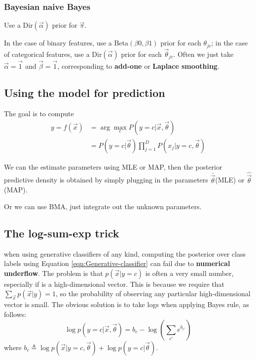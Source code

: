 {\subsubsection{Bayesian naive Bayes}
\label{sec:Bayesian-naive-Bayes}
Use a Dir$(\vec{\alpha})$ prior for $\vec{\pi}$.

In the case of binary features, use a Beta$(\beta0,\beta1)$ prior for each $\theta_{jc}$; in the case of categorical features, use a Dir$(\vec{\alpha})$ prior for each  $\vec{\theta}_{jc}$. Often we just take $\vec{\alpha}=\vec{1}$ and $\vec{\beta}=\vec{1}$, corresponding to \textbf{add-one} or \textbf{Laplace smoothing}.


\subsection{Using the model for prediction}
The goal is to compute
\begin{equation}\begin{split}
y=f(\vec{x}) & =\arg\max\limits_{c}{P(y=c|\vec{x},\vec{\theta})} \\
   & =P(y=c|\vec{\theta})\prod_{j=1}^D P(x_j|y=c,\vec{\theta})
\end{split}\end{equation}

We can the estimate parameters using MLE or MAP, then the posterior predictive density is obtained by simply plugging in the parameters $\bar{\vec{\theta}}$(MLE) or $\hat{\vec{\theta}}$(MAP). 

Or we can use BMA, just integrate out the unknown parameters.


\subsection{The log-sum-exp trick}
when using generative classifiers of any kind, computing the posterior over class labels using Equation \ref{eqn:Generative-classifier} can fail due to \textbf{numerical underflow}. The problem is that $p(\vec{x}|y=c)$ is often a very small number, especially if  is a high-dimensional vector. This is because we require that $\sum_{\vec{x}}p(\vec{x}|y)=1$, so the probability of observing any particular high-dimensional vector is small. The obvious solution is to take logs when applying Bayes rule, as follows:
\begin{equation}
\log p(y=c|\vec{x},\vec{\theta})=b_c-\log\left(\sum\limits_{c'}e^{b_{c'}}\right)
\end{equation}
where $b_c \triangleq \log p(\vec{x}|y=c,\vec{\theta})+\log p(y=c|\vec{\theta})$.

}
